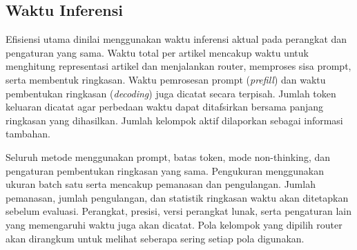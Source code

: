 \subsection{Waktu Inferensi}

Efisiensi utama dinilai menggunakan waktu inferensi aktual pada perangkat dan pengaturan yang sama. Waktu total per artikel mencakup waktu untuk menghitung representasi artikel dan menjalankan router, memproses sisa prompt, serta membentuk ringkasan. Waktu pemrosesan prompt (\textit{prefill}) dan waktu pembentukan ringkasan (\textit{decoding}) juga dicatat secara terpisah. Jumlah token keluaran dicatat agar perbedaan waktu dapat ditafsirkan bersama panjang ringkasan yang dihasilkan. Jumlah kelompok aktif dilaporkan sebagai informasi tambahan.

Seluruh metode menggunakan prompt, batas token, mode non-thinking, dan pengaturan pembentukan ringkasan yang sama. Pengukuran menggunakan ukuran batch satu serta mencakup pemanasan dan pengulangan. Jumlah pemanasan, jumlah pengulangan, dan statistik ringkasan waktu akan ditetapkan sebelum evaluasi. Perangkat, presisi, versi perangkat lunak, serta pengaturan lain yang memengaruhi waktu juga akan dicatat. Pola kelompok yang dipilih router akan dirangkum untuk melihat seberapa sering setiap pola digunakan.
